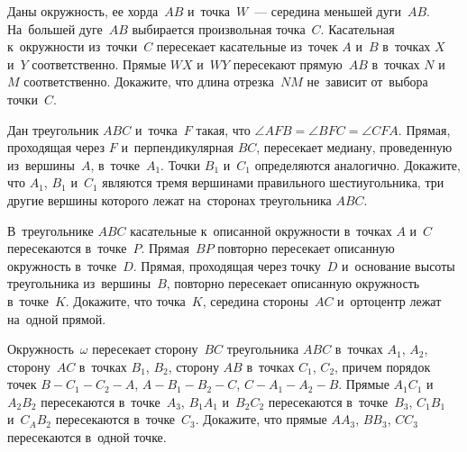 


\begin{problems}

\item
Даны окружность, ее хорда~$AB$ и~точка~$W$~--- середина меньшей дуги~$AB$.
На~большей дуге~$AB$ выбирается произвольная точка~$C$.
Касательная к~окружности из~точки~$C$ пересекает касательные из~точек $A$ и~$B$
в~точках $X$ и~$Y$ соответственно.
Прямые $WX$ и~$WY$ пересекают прямую~$AB$ в~точках $N$ и~$M$ соответственно.
Докажите, что длина отрезка~$NM$ не~зависит от~выбора точки~$C$.

\item
Дан треугольник $ABC$ и~точка~$F$ такая, что
$\angle AFB = \angle BFC = \angle CFA$.
Прямая, проходящая через $F$ и~перпендикулярная $BC$, пересекает медиану,
проведенную из~вершины~$A$, в~точке~$A_{1}$.
Точки $B_{1}$ и~$C_{1}$ определяются аналогично.
Докажите, что $A_{1}$, $B_{1}$ и~$C_{1}$ являются тремя вершинами правильного
шестиугольника, три другие вершины которого лежат на~сторонах
треугольника $ABC$.

\item
В~треугольнике $ABC$ касательные к~описанной окружности в~точках $A$ и~$C$
пересекаются в~точке~$P$.
Прямая~$BP$ повторно пересекает описанную окружность в~точке~$D$.
Прямая, проходящая через точку~$D$ и~основание высоты треугольника
из~вершины~$B$, повторно пересекает описанную окружность в~точке~$K$.
Докажите, что точка~$K$, середина стороны~$AC$ и~ортоцентр лежат
на~одной прямой.

\item
Окружность~$\omega$ пересекает
сторону~$BC$ треугольника $ABC$ в~точках $A_{1}$, $A_{2}$,
сторону~$AC$ в~точках $B_{1}$, $B_{2}$,
сторону $AB$ в~точках $C_{1}$, $C_{2}$,
причем порядок точек
$B {-} C_{1} {-} C_{2} {-} A$,
$A {-} B_{1} {-} B_{2} {-} C$,
$C {-} A_{1} {-} A_{2} {-} B$.
Прямые $A_{1}C_{1}$ и~$A_{2}B_{2}$ пересекаются в~точке~$A_{3}$,
$B_{1}A_{1}$ и~$B_{2}C_{2}$ пересекаются в~точке~$B_{3}$,
$C_{1}B_{1}$ и~$C_{A}B_{2}$ пересекаются в~точке~$C_{3}$.
Докажите, что прямые $AA_{3}$, $BB_{3}$, $CC_{3}$ пересекаются в~одной точке.

\end{problems}

